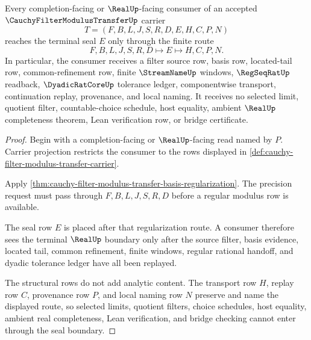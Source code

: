 \begin{theorem}
\label{thm:cauchy-filter-modulus-transfer-real-seal-boundary}
Every completion-facing or $\RealUp$-facing consumer of an accepted $\CauchyFilterModulusTransferUp$ carrier
$$
T=(F,B,L,J,S,R,D,E,H,C,P,N)
$$
reaches the terminal seal $E$ only through the finite route
$$
F,B,L,J,S,R,D \longmapsto E \longmapsto H,C,P,N .
$$
In particular, the consumer receives a filter source row, basis row, located-tail row, common-refinement row, finite $\StreamNameUp$ windows, $\RegSeqRatUp$ readback, $\DyadicRatCoreUp$ tolerance ledger, componentwise transport, continuation replay, provenance, and local naming. It receives no selected limit, quotient filter, countable-choice schedule, host equality, ambient $\RealUp$ completeness theorem, Lean verification row, or bridge certificate.
\end{theorem}
\begin{proof}
Begin with a completion-facing or $\RealUp$-facing read named by $P$. Carrier projection restricts the consumer to the rows displayed in \autoref{def:cauchy-filter-modulus-transfer-carrier}.

Apply \autoref{thm:cauchy-filter-modulus-transfer-basis-regularization}. The precision request must pass through $F,B,L,J,S,R,D$ before a regular modulus row is available.

The seal row $E$ is placed after that regularization route. A consumer therefore sees the terminal $\RealUp$ boundary only after the source filter, basis evidence, located tail, common refinement, finite windows, regular rational handoff, and dyadic tolerance ledger have all been replayed.

The structural rows do not add analytic content. The transport row $H$, replay row $C$, provenance row $P$, and local naming row $N$ preserve and name the displayed route, so selected limits, quotient filters, choice schedules, host equality, ambient real completeness, Lean verification, and bridge checking cannot enter through the seal boundary.
\end{proof}

